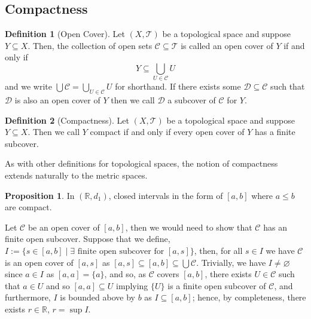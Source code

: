 \documentclass[
]{article}
\theoremstyle{definition}
\newtheorem{prop}{Proposition}
\theoremstyle{definition}
\newtheorem{definition}{Definition}[section]
\begin{document}
\hypertarget{compactness}{%
\subsection{Compactness}\label{compactness}}

\begin{definition}[Open Cover]
  Let \((X, \mathcal{T})\) be a topological space and suppose \(Y \subseteq X\). 
  Then, the collection of open sets \(\mathcal{C} \subseteq \mathcal{T}\) is 
  called an open cover of \(Y\) if and only if 
  \[Y \subseteq \bigcup_{U \in \mathcal{C}} U\]
  and we write \(\bigcup \mathcal{C} = \bigcup_{U \in \mathcal{C}} U\) for shorthand. 
  If there exists some \(\mathcal{D} \subseteq \mathcal{C}\) such that 
  \(\mathcal{D}\) is also an open cover of \(Y\) then we call \(\mathcal{D}\) a 
  subcover of \(\mathcal{C}\) for \(Y\).
\end{definition}

\begin{definition}[Compactness]
  Let \((X, \mathcal{T})\) be a topological space and suppose \(Y \subseteq X\). 
  Then we call \(Y\) compact if and only if every open cover of \(Y\) has a finite 
  subcover.
\end{definition}

As with other definitions for topological spaces, the notion of
compactness extends naturally to the metric spaces.

\begin{prop}
  In \((\mathbb{R}, d_1)\), closed intervals in the form of \([a, b]\) where 
  \(a \le b\) are compact. 
\end{prop}
\proof

Let \(\mathcal{C}\) be an open cover of \([a, b]\), then we would need
to show that \(\mathcal{C}\) has an finite open subcover. Suppose that
we define,
\(I := \{s \in [a, b] \mid \exists \text{ finite open subcover for } [a, s]\}\),
then, for all \(s \in I\) we have \(\mathcal{C}\) is an open cover of
\([a, s]\) as \([a, s] \subseteq [a, b] \subseteq \bigcup \mathcal{C}\).
Trivially, we have \(I \neq \varnothing\) since \(a \in I\) as
\([a, a] = \{a\}\), and so, as \(\mathcal{C}\) covers \([a, b]\), there
exists \(U \in \mathcal{C}\) such that \(a \in U\) and so
\([a, a] \subseteq U\) implying \(\{U\}\) is a finite open subcover of
\(\mathcal{C}\), and furthermore, \(I\) is bounded above by \(b\) as
\(I \subseteq [a, b]\); hence, by completeness, there exists
\(r \in \mathbb{R}\), \(r = \sup I\).
\end{document}
